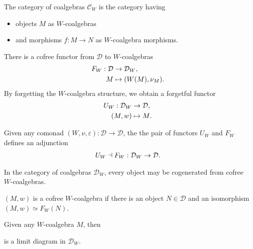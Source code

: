 \documentclass[../thesis.tex]{subfiles}
\begin{document}
    \begin{definition}
        The category of coalgebras $\mathcal{C}_W$ is the category having
        \begin{itemize}
            \item objects $M$ as $W$-coalgebras
            \item and morphisms $f : M \rightarrow N$ as $W$-coalgebra morphisms.
        \end{itemize}
    \end{definition}

    There is a cofree functor from $\mathcal{D}$ to $W$-coalgebras
    \begin{align*}
        F_W : \mathcal{D} & \rightarrow \mathcal{D}_W\tt{,} \\
        M & \mapsto (W(M),\nu_M)\tt{.}
    \end{align*}
    By forgetting the $W$-coalgebra structure, we obtain a forgetful functor
    \begin{align*}
        U_W : \mathcal{D}_W & \rightarrow \mathcal{D}\tt{,} \\
        (M, w) & \mapsto M\tt{.}
    \end{align*}
    \begin{lemma}
        Given any comonad $(W, \nu, \varepsilon) : \mathcal{D} \rightarrow \mathcal{D}$, the the pair of functors $U_W$ and $F_W$ defines an adjunction
        \begin{align*}
            U_W \dashv F_W : \mathcal{D}_W \rightarrow \mathcal{D}\tt{.}
        \end{align*} 
    \end{lemma}

    In the category of coalgebras $\mathcal{D}_W$, every object may be cogenerated from cofree $W$-coalgebras.
    \begin{definition}
        $(M,w)$ is a cofree $W$-coalgebra if there is an object $N \in \mathcal{D}$ and an isomorphism $(M,w) \simeq F_W(N)$.
    \end{definition}
    \begin{proposition}
        Given any $W$-coalgebra $M$, then
        \begin{center}
        \end{center}
        is a limit diagram in $\mathcal{D}_W$.
    \end{proposition}
\end{document}
